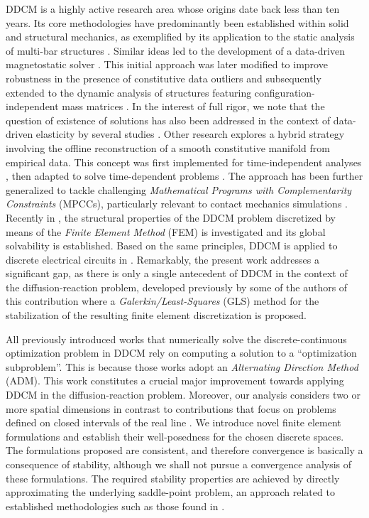 DDCM is a highly active research area whose origins date back less than ten years. Its core methodologies have predominantly been established within solid and structural mechanics, as exemplified by its application to the static analysis of multi-bar structures \cite{Kirchdoerfer2016}. Similar ideas led to the development of a data-driven magnetostatic solver \cite{Galetzka2020}. This initial approach was later modified to improve robustness in the presence of constitutive data outliers \cite{Kirchdoerfer2017} and subsequently extended to the dynamic analysis of structures featuring configuration-independent mass matrices \cite{Kirchdoerfer2018}. In the interest of full rigor, we note that the question of existence of solutions has also been addressed in the context of data-driven elasticity by several studies \cite{Conti2018,Conti2020,Gebhardt2026}.
Other research explores a hybrid strategy involving the offline reconstruction of a smooth constitutive manifold from empirical data. This concept was first implemented for time-independent analyses \cite{Gebhardt:2020a}, then adapted to solve time-dependent problems \cite{Gebhardt:2020b}. The approach has been further generalized to tackle challenging \textit{Mathematical Programs with Complementarity Constraints} (MPCCs), particularly relevant to contact mechanics simulations \cite{Gebhardt2024a}. Recently in  \cite{Gebhardt2024b}, the structural properties of the DDCM problem discretized by means of the \textit{Finite Element Method} (FEM) is investigated and its global solvability is established. Based on the same principles, DDCM is applied to discrete electrical circuits in \cite{Gebhardt2025}. Remarkably, the present work addresses a significant gap, as there is only a single antecedent of DDCM in the context of the diffusion-reaction problem, developed previously by some of the authors of this contribution \cite{Balbao2025} where a \textit{Galerkin/Least-Squares} (GLS) method for the stabilization of the resulting finite element discretization is proposed.

All previously introduced works that numerically solve the discrete-continuous optimization problem in DDCM rely on computing a solution to a ``optimization subproblem''. This is because those works adopt an \textit{Alternating Direction Method} (ADM). This work constitutes a crucial major improvement towards applying DDCM in the diffusion-reaction problem. Moreover, our analysis considers two or more spatial dimensions in contrast to contributions that focus on problems defined on closed intervals of the real line \cite{Gebhardt:2020a, Gebhardt:2020b, Gebhardt2024a, Gebhardt2024b}. We introduce novel finite element formulations and establish their well-posedness for the chosen discrete spaces. The formulations proposed are consistent, and therefore convergence is basically a consequence of stability, although we shall not pursue a convergence analysis of these formulations. The required stability properties are achieved by directly approximating the underlying saddle-point problem, an approach related to established methodologies such as those found in \cite{Masud2002, Bochev2006, Badia2010, Burman2023}.

